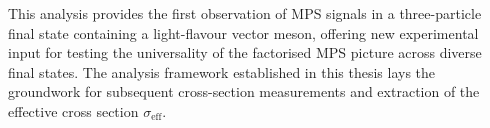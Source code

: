 \begin{abstract*}
  This analysis provides the first observation of MPS signals in a three-particle final
  state containing a light-flavour vector meson, offering new experimental input for
  testing the universality of the factorised MPS picture across diverse final states.
  The analysis framework established in this thesis lays the groundwork for subsequent
  cross-section measurements and extraction of the effective cross section $\sigma_{\mathrm{eff}}$.

\end{abstract*}
